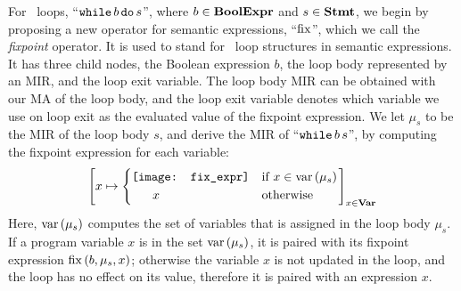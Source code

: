 For \whilelit~loops, ``$\texttt{while}\, b\, \texttt{do}\, s$'', where $b \in \mathbf{BoolExpr}$
and $s \in \mathbf{Stmt}$, we begin by proposing a new operator for semantic
expressions, ``$\operatorname{\mathrm{fix}}$'', which we call the \emph{fixpoint} operator.  It is
used to stand for \whilelit~loop structures in semantic expressions.  It has
three child nodes, the Boolean expression $b$, the loop body represented by an
MIR, and the loop exit variable.  The loop body MIR can be obtained with our MA
of the loop body, and the loop exit variable denotes which variable we use on
loop exit as the evaluated value of the fixpoint expression.  We let $\mu_s$ to
be the MIR of the loop body $s$, and derive the MIR of ``$\texttt{while}\, b\, s$'',
by computing the fixpoint expression for each variable:
\begin{equation}
    \left[
        x \mapsto \left\{
            \begin{aligned}
                & \begin{aligned}
                    \texttt{[image: fix\_expr]}
                \end{aligned} && \text{if~} x \in \mathrm{var}\left(\mu_s\right) \\
                & \quad ~ ~ x && \text{otherwise}
            \end{aligned}
        \right.
    \right]_{x \in \mathbf{Var}}
    \label{po:eq:mir_while}
\end{equation}
Here, $\mathrm{var}\left(\mu_s\right)$ computes the set of variables that is assigned in the
loop body $\mu_s$.  If a program variable $x$ is in the set $\mathrm{var}\left(\mu_s\right)$,
it is paired with its fixpoint expression $\operatorname{\mathrm{fix}}\left({b, \mu_s, x}\right)$; otherwise
the variable $x$ is not updated in the loop, and the loop has no effect on its
value, therefore it is paired with an expression $x$.
